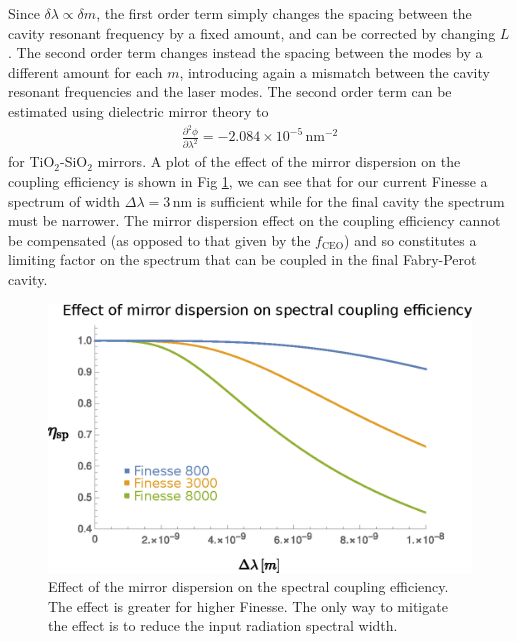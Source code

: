 Since $\delta\lambda \propto \delta m$, the first order term simply changes the spacing between the cavity resonant frequency by a fixed amount, and can be corrected by changing $L$. The second order term changes instead the spacing between the modes by a different amount for each $m$, introducing again a mismatch between the cavity resonant frequencies and the laser modes. The second order term can be estimated using dielectric mirror theory \parencite{Garmire2003} to
\begin{align}
	\frac{\partial^2\phi}{\partial\lambda^2} = -2.084\times 10^{-5}\,\mathrm{nm}^{-2}
\end{align}
for TiO$_2$-SiO$_2$ mirrors. A plot of the effect of the mirror dispersion on the coupling efficiency is shown in Fig \ref{fig:dispersion}, we can see that for our current Finesse a spectrum of width $\Delta\lambda = 3\,$nm is sufficient while for the final cavity the spectrum must be narrower. The mirror dispersion effect on the coupling efficiency cannot be compensated (as opposed to that given by the $f_\mathrm{CEO}$) and so constitutes a limiting factor on the spectrum that can be coupled in the final Fabry-Perot cavity.
\begin{figure}
	\centering
	\includegraphics[width=0.9\linewidth]{images/dispersion.eps}
	\caption{Effect of the mirror dispersion on the spectral coupling efficiency. The effect is greater for higher Finesse. The only way to mitigate the effect is to reduce the input radiation spectral width.}
	\label{fig:dispersion}
\end{figure}

